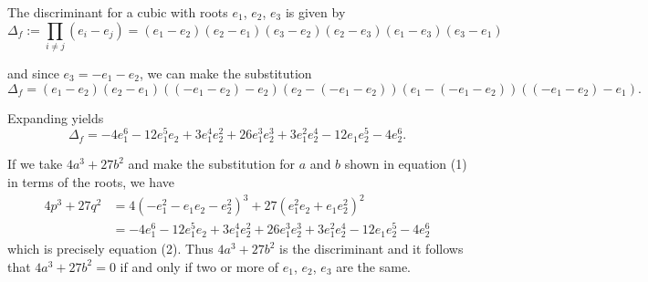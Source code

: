 \documentclass{amsart}
\begin{document}
	The discriminant for a cubic with roots $e_1$, $e_2$, $e_3$ is given by
	$$ \Delta_f := \prod_{i\neq j} (e_i - e_j) = (e_1 - e_2)(e_2 - e_1)(e_3 - e_2)(e_2 - e_3)(e_1 - e_3)(e_3 - e_1) $$
	
	and since $e_3 = - e_1 - e_2$, we can make the substitution
	$$ \Delta_f = (e_1 - e_2)(e_2 - e_1)((-e_1-e_2) - e_2)(e_2 - (-e_1-e_2))(e_1 - (-e_1-e_2))((-e_1-e_2) - e_1) . $$
	
	Expanding yields
	\begin{equation}
	\Delta_f = -4 e_1^6 - 12 e_1^5 e_2 + 3 e_1^4 e_2^2 + 26 e_1^3 e_2^3 + 3 e_1^2 e_2^4 - 12 e_1 e_2^5 - 4 e_2^6 .
	\end{equation}
	
	If we take $4a^3 + 27b^2$ and make the substitution for $a$ and $b$ shown in equation (1) in terms of the roots, we have
	\begin{equation*}
	\begin{split}
	4 p^3 + 27 q^2 & = 4 (-e_1^2 - e_1e_2 - e_2^2)^3 + 27 (e_1^2e_2 + e_1e_2^2)^2 \\
	&= -4 e_1^6 - 12 e_1^5 e_2 + 3 e_1^4 e_2^2 + 26 e_1^3 e_2^3 + 3 e_1^2 e_2^4 - 12 e_1 e_2^5 - 4 e_2^6
	\end{split}
	\end{equation*}
	which is precisely equation (2). Thus $4a^3 + 27b^2$ is the discriminant and it follows that $4a^3 + 27b^2 = 0$ if and only if two or more of $e_1$, $e_2$, $e_3$ are the same.
	
	
	
	
	
	
	
	
	
	
	
	
	
	
	
	
	
	
	
	
	
	
	
	
	
\end{document}
